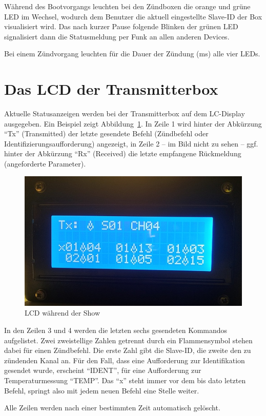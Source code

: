 \documentclass[pdftex, parskip, numbers=noenddot, toc=listof]{scrbook}
\begin{document}
	Während des Bootvorgangs leuchten bei den Zündboxen die orange und grüne LED im Wechsel, wodurch dem Benutzer die aktuell eingestellte Slave-ID der Box visualisiert wird. Das nach kurzer Pause folgende Blinken der grünen LED signalisiert dann die Statusmeldung per Funk an allen anderen Devices.

	Bei einem Zündvorgang leuchten für die Dauer der Zündung (\unit[11]{ms}) alle vier LEDs.

	\section{Das LCD der Transmitterbox}

	Aktuelle Statusanzeigen werden bei der Transmitterbox auf dem LC-Display ausgegeben. Ein Beispiel zeigt Abbildung~\ref{fig:senderanzeige}. In Zeile 1 wird hinter der Abkürzung \enquote{Tx} (Transmitted) der letzte gesendete Befehl (Zündbefehl oder Identifizierungsaufforderung) angezeigt, in Zeile 2 -- im Bild nicht zu sehen -- ggf. hinter der Abkürzung \enquote{Rx} (Received) die letzte empfangene Rückmeldung (angeforderte Parameter).

	\begin{figure}
		\centering
		\includegraphics[width=.7\textwidth]{Bilder/SenderAnzeige}
		\caption{LCD während der Show}
		\label{fig:senderanzeige}
	\end{figure}

	In den Zeilen 3 und 4 werden die letzten sechs gesendeten Kommandos aufgelistet. Zwei zweistellige Zahlen getrennt durch ein Flammensymbol stehen dabei für einen Zündbefehl. Die erste Zahl gibt die Slave-ID, die zweite den zu zündenden Kanal an. Für den Fall, dass eine Aufforderung zur Identifikation gesendet wurde, erscheint \enquote{IDENT}, für eine Aufforderung zur Temperaturmessung \enquote{TEMP}. Das \enquote{x} steht immer vor dem bis dato letzten Befehl, springt also mit jedem neuen Befehl eine Stelle weiter.

	Alle Zeilen werden nach einer bestimmten Zeit automatisch gelöscht.
\end{document}
